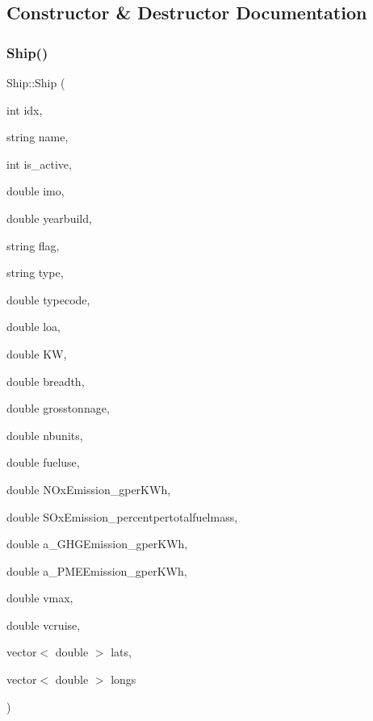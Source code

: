 \subsection{Constructor \& Destructor Documentation}
\mbox{\label{class_ship_ac888d178c7dee8201424a36bc2c13e20}} 
\subsubsection{\texorpdfstring{Ship()}{Ship()}\hspace{0.1cm}{\footnotesize\ttfamily [1/2]}}
{\footnotesize\ttfamily Ship\+::\+Ship (\begin{DoxyParamCaption}\item[{int}]{idx,  }\item[{string}]{name,  }\item[{int}]{is\+\_\+active,  }\item[{double}]{imo,  }\item[{double}]{yearbuild,  }\item[{string}]{flag,  }\item[{string}]{type,  }\item[{double}]{typecode,  }\item[{double}]{loa,  }\item[{double}]{KW,  }\item[{double}]{breadth,  }\item[{double}]{grosstonnage,  }\item[{double}]{nbunits,  }\item[{double}]{fueluse,  }\item[{double}]{N\+Ox\+Emission\+\_\+gper\+K\+Wh,  }\item[{double}]{S\+Ox\+Emission\+\_\+percentpertotalfuelmass,  }\item[{double}]{a\+\_\+\+G\+H\+G\+Emission\+\_\+gper\+K\+Wh,  }\item[{double}]{a\+\_\+\+P\+M\+E\+Emission\+\_\+gper\+K\+Wh,  }\item[{double}]{vmax,  }\item[{double}]{vcruise,  }\item[{vector$<$ double $>$}]{lats,  }\item[{vector$<$ double $>$}]{longs }\end{DoxyParamCaption})}

\mbox{\label{class_ship_ab7608fcfc4d27c678aacaf9bfd68a462}} 
